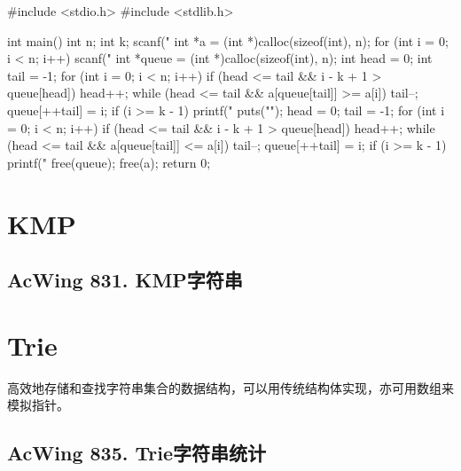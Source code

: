 \begin{mycpptwocol}
#include <stdio.h>
#include <stdlib.h>

int main()
{
    int n;
    int k;
    scanf("%
    int *a = (int *)calloc(sizeof(int), n);
    for (int i = 0; i < n; i++) {
        scanf("%
    }
    int *queue = (int *)calloc(sizeof(int), n);
    int head = 0;
    int tail = -1;
    for (int i = 0; i < n; i++) {
        if (head <= tail && i - k + 1 > queue[head]) {
            head++;
        }
        while (head <= tail && a[queue[tail]] >= a[i]) {
            tail--;
        }
        queue[++tail] = i;
        if (i >= k - 1) {
            printf("%
        }
    }
    puts("");
    head = 0;
    tail = -1;
    for (int i = 0; i < n; i++) {
        if (head <= tail && i - k + 1 > queue[head]) {
            head++;
        }
        while (head <= tail && a[queue[tail]] <= a[i]) {
            tail--;
        }
        queue[++tail] = i;
        if (i >= k - 1) {
            printf("%
        }
    }
    free(queue);
    free(a);
    return 0;
}
\end{mycpptwocol}
\section{KMP}
\subsection{AcWing 831. KMP字符串}

\section{Trie}
高效地存储和查找字符串集合的数据结构，可以用传统结构体实现，亦可用数组来模拟指针。


\subsection{AcWing 835. Trie字符串统计}

